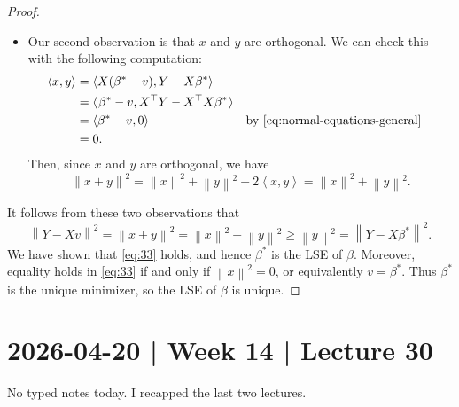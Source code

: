 \documentclass[10pt]{article}
\theoremstyle{definition}
\newcommand{\norm}[1]{\left\lVert#1\right\rVert} %
\newcommand{\1}[1]{\textbf{1}_{\left[#1\right]}} %
\begin{document}
\begin{proof}
\begin{itemize}
\begin{center}
    \end{center}
    
    \item Our second observation is that $x$ and $y$ are orthogonal. We can
    check this with the following computation:
    \begin{align*}
      \left\langle x,y \right\rangle 
      &= \left\langle X(\beta^{*}-v),Y-X\beta^{*}
        \right\rangle \\
      &= \left\langle \beta^{*}-v, X^{\top}Y - X^{\top}X \beta^{*}
        \right\rangle \\
      &= \left\langle \beta^{*}-v,0 \right\rangle  &&\text{by \cref{eq:normal-equations-general}} \\
      &= 0.
    \end{align*}
    Then, since $x$ and $y$ are orthogonal, we have
    \begin{equation*}
        \norm{x+y}^{2} = \norm{x}^{2}+\norm{y}^{2} +2
        \left\langle x,y \right\rangle = \norm{x}^{2} + \norm{y}^{2}.
    \end{equation*}
  \end{itemize}
  It follows from these two observations that
  \begin{equation*}
    \norm{Y-Xv}^{2} = \norm{x+y}^{2} = \norm{x}^{2} + \norm{y}^{2} \geq
    \norm{y}^{2} = \norm{Y-X\beta^{*}}^{2}.
  \end{equation*}
  We have shown that \cref{eq:33} holds, and hence $\beta^{*}$ is the LSE of
  $\beta$. Moreover, equality holds in \cref{eq:33} if and only if
  $\norm{x}^{2} = 0$, or equivalently $v=\beta^{*}$. Thus $\beta^{*}$ is the
  unique minimizer, so the LSE of $\beta$ is unique. 
\end{proof}
 
\newpage
\section{2026-04-20 | Week 14 | Lecture 30}
No typed notes today. I recapped the last two lectures.
\newpage
\end{document}
